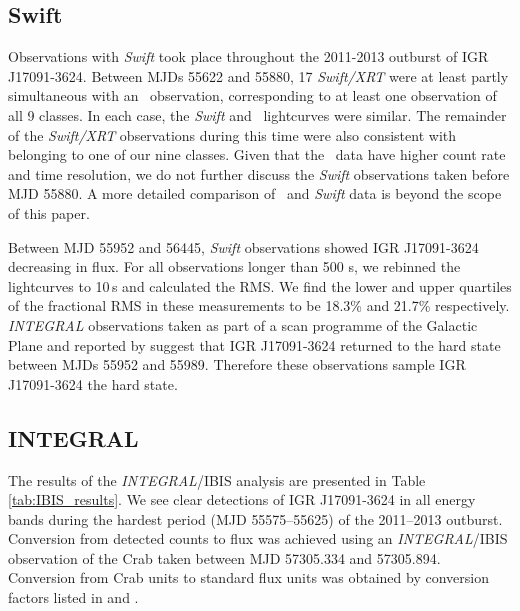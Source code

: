 \subsection{Swift}

\par Observations with \textit{Swift} took place throughout the 2011-2013 outburst of IGR J17091-3624.  Between MJDs 55622 and 55880, 17 \textit{Swift/XRT} were at least partly simultaneous with an \rxte\ observation, corresponding to at least one observation of all 9 classes.  In each case, the \textit{Swift} and \rxte\ lightcurves were similar.  The remainder of the \textit{Swift/XRT} observations during this time were also consistent with belonging to one of our nine classes.  Given that the \rxte\ data have higher count rate and time resolution, we do not further discuss the \textit{Swift} observations taken before MJD 55880.  A more detailed comparison of \rxte\ and \textit{Swift} data is beyond the scope of this paper.
\par Between MJD 55952 and 56445, \textit{Swift} observations showed IGR J17091-3624 decreasing in flux.  For all observations longer than 500 s, we rebinned the lightcurves to 10\,s and calculated the RMS.  We find the lower and upper quartiles of the fractional RMS in these measurements to be 18.3\% and 21.7\% respectively.  \textit{INTEGRAL} observations taken as part of a scan programme of the Galactic Plane \citep{Fiocchi_PlaneScan} and reported by \citet{Drave_Return} suggest that IGR J17091-3624 returned to the hard state between MJDs 55952 and 55989.  Therefore these observations sample IGR J17091-3624 the hard state.

\subsection{INTEGRAL}

\par The results of the \textit{INTEGRAL}/IBIS analysis are presented in Table \ref{tab:IBIS_results}. We see clear detections of IGR J17091-3624 in all energy bands during the hardest period (MJD 55575--55625) of the 2011--2013 outburst. Conversion from detected counts to flux was achieved using an \textit{INTEGRAL}/IBIS observation of the Crab taken between MJD 57305.334 and 57305.894. Conversion from Crab units to standard flux units was obtained by conversion factors listed in \citet{Bird_Survey} and \citet{Bazzano_Survey}.

